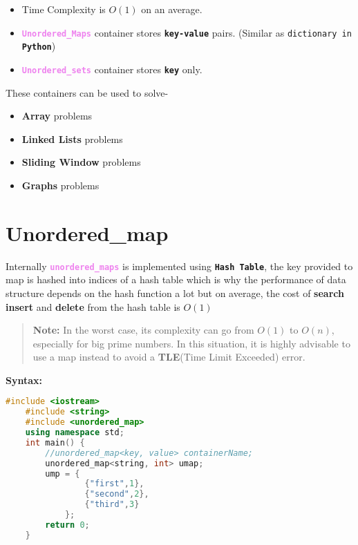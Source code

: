 \begin{itemize}
	\item Time Complexity is $O(1)$ on an average.
	
	\item \textbf{\textcolor{violet}{\texttt{Unordered\_Maps}}} container stores \textbf{\texttt{key-value}} pairs. (Similar as \texttt{dictionary in \textbf{Python}})
	
	\item \textbf{\textcolor{violet}{\texttt{Unordered\_sets}}} container stores \textbf{\texttt{key}} only.
\end{itemize}

These containers can be used to solve-
\begin{itemize}
	\item \textbf{Array} problems
	\item \textbf{Linked Lists} problems
	\item \textbf{Sliding Window} problems
	\item \textbf{Graphs} problems
\end{itemize}



\section{Unordered\_map}
Internally \textbf{\textcolor{violet}{\texttt{unordered\_maps}}} is implemented using \textbf{\texttt{Hash Table}}, the key provided to map is hashed into indices of a hash table which is why the performance of data structure depends on the hash function a lot but on average, the cost of \textbf{search} \textbf{insert} and \textbf{delete} from the hash table is $O(1)$\\

\begin{quotation}
	\textbf{Note:} In the worst case, its complexity can go from $O(1)$ to $O(n)$, especially for big prime numbers. In this situation, it is highly advisable to use a map instead to avoid a \textbf{TLE}(Time Limit Exceeded) error.
\end{quotation}


\textbf{Syntax:}
\begin{lstlisting}[language=C++]
	#include <iostream>
	#include <string>
	#include <unordered_map>
	using namespace std;
	int main() {	
		//unordered_map<key, value> containerName;
		unordered_map<string, int> umap;
		ump = {
				{"first",1},
				{"second",2},
				{"third",3}
			};
		return 0;
	}
\end{lstlisting}

